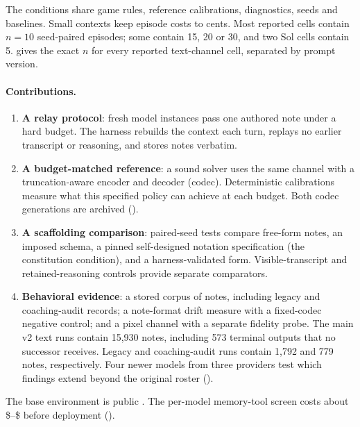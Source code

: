 The conditions share game rules, reference calibrations, diagnostics, seeds and baselines. Small contexts keep episode costs to cents. Most reported cells contain $n{=}10$ seed-paired episodes; some contain 15, 20 or 30, and two Sol cells contain 5.  gives the exact $n$ for every reported text-channel cell, separated by prompt version.

\paragraph{Contributions.}
\begin{enumerate}
\item \textbf{A relay protocol}: fresh model instances pass one authored note under a hard budget. The harness rebuilds the context each turn, replays no earlier transcript or reasoning, and stores notes verbatim.
\item \textbf{A budget-matched reference}: a sound solver uses the same channel with a truncation-aware encoder and decoder (codec). Deterministic calibrations measure what this specified policy can achieve at each budget. Both codec generations are archived ().
\item \textbf{A scaffolding comparison}: paired-seed tests compare free-form notes, an imposed schema, a pinned self-designed notation specification (the constitution condition), and a harness-validated form. Visible-transcript and retained-reasoning controls provide separate comparators.
\item \textbf{Behavioral evidence}: a stored corpus of \relaystorednotes{} notes, including legacy and coaching-audit records; a note-format drift measure with a fixed-codec negative control; and a pixel channel with a separate fidelity probe. The main v2 text runs contain 15,930 notes, including 573 terminal outputs that no successor receives. Legacy and coaching-audit runs contain 1,792 and 779 notes, respectively. Four newer models from three providers test which findings extend beyond the original roster ().
\end{enumerate}

The base environment is public \citep{blindboarddata2026}. The per-model memory-tool screen costs about \$\relayfitcostnano--\$\relayfitcostsol{} before deployment ().
